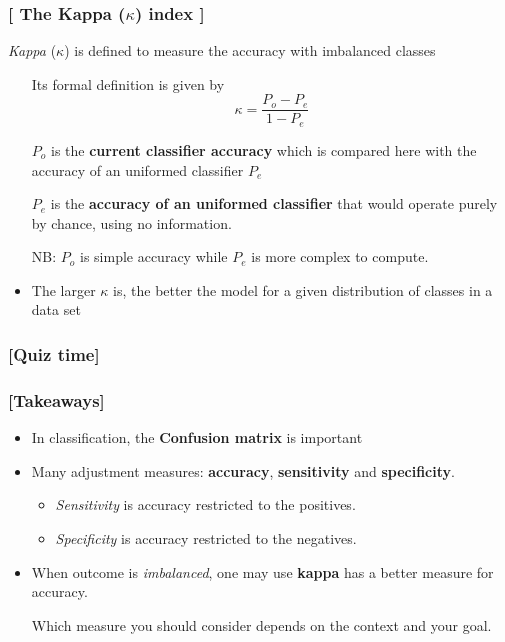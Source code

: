 \documentclass[xcolor=x11names,compress, handhouts]{beamer}
\renewcommand{\(}{\begin{columns}}
\renewcommand{\)}{\end{columns}}
\newcommand{\<}[1]{\begin{column}{#1}}
\renewcommand{\>}{\end{column}}
\begin{document}
\begin{frame} %
\frametitle{\textcolor{brique}{[ The Kappa ($\kappa$) index ]}}
\emph{Kappa} ($\kappa$) is defined to measure the accuracy with imbalanced classes
\begin{itemize}[<+->]
  \item[] Its formal definition is given by
  $$ \kappa = \frac{P_o - P_e}{1 - P_e}  $$
  \item[]$P_o$ is the \textbf{current classifier accuracy} which is compared here with the accuracy of an uniformed classifier $P_e$
  \item[] $P_e$ is the \textbf{accuracy of an uniformed classifier} that would operate purely by chance, using no information.
  \item[NB:] $P_o$ is simple accuracy while $P_e$  is more complex to compute.
  \item  The larger $\kappa $ is, the better the model for a given distribution of classes in a data set
  \end{itemize}
\end{frame}

\begin{frame} %
\frametitle{\textcolor{brique}{[Quiz time]}}
\pause
\begin{itemize}[<+->]
  \item[]
\end{itemize}
\end{frame}


\begin{frame} %
\frametitle{\textcolor{brique}{[Takeaways]}}
\begin{itemize}[<+->]
  \item In classification, the \textbf{Confusion matrix} is important
 \item Many adjustment measures:  \textbf{accuracy}, \textbf{sensitivity} and \textbf{specificity}.
    \begin{itemize}[<+->]
      \item \textit{Sensitivity} is accuracy restricted to the positives.
      \item \textit{Specificity} is accuracy restricted to the negatives.
   \end{itemize}
 \item When  outcome is \textit{imbalanced}, one may use \textbf{kappa} has a better measure for accuracy.
  \item[] Which measure you should consider depends on the context and your goal.
\end{itemize}
\end{frame}
\end{document}
